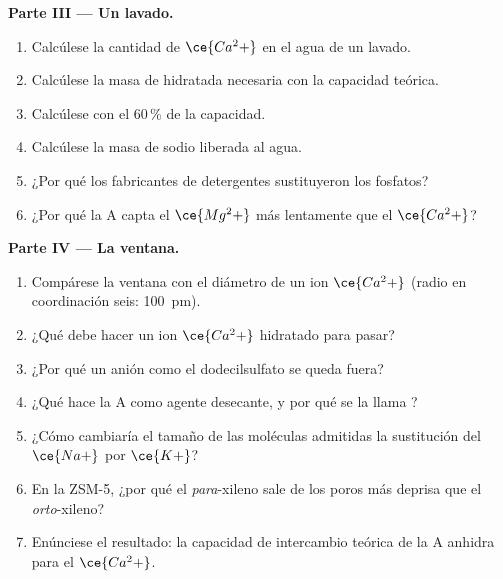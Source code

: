 \begin{problem}
\medskip\noindent\textbf{Parte III --- Un lavado.}
\begin{enumerate}[resume]
  \item Calcúlese la cantidad de $\ce{Ca^2+}$ en el agua de un lavado.
  \item Calcúlese la masa de  hidratada necesaria con la capacidad teórica.
  \item Calcúlese con el 60\,\% de la capacidad.
  \item Calcúlese la masa de sodio liberada al agua.
  \item ¿Por qué los fabricantes de detergentes sustituyeron los fosfatos?
  \item ¿Por qué la  A capta el $\ce{Mg^2+}$ más lentamente que el $\ce{Ca^2+}$?
\end{enumerate}

\medskip\noindent\textbf{Parte IV --- La ventana.}
\begin{enumerate}[resume]
  \item Compárese la ventana con el diámetro de un ion $\ce{Ca^2+}$ (radio en coordinación seis:
        \qty{100}{pm}).
  \item ¿Qué debe hacer un ion $\ce{Ca^2+}$ hidratado para pasar?
  \item ¿Por qué un anión  como el dodecilsulfato se queda fuera?
  \item ¿Qué hace la  A como agente desecante, y por qué se la llama
        ?
  \item ¿Cómo cambiaría el tamaño de las moléculas admitidas la sustitución del $\ce{Na+}$ por $\ce{K+}$?
  \item En la ZSM-5, ¿por qué el \textit{para}-xileno sale de los poros más deprisa que el \textit{orto}-xileno?
  \item Enúnciese el resultado: la capacidad de intercambio teórica de la  A anhidra
        para el $\ce{Ca^2+}$.
\end{enumerate}
\end{problem}
